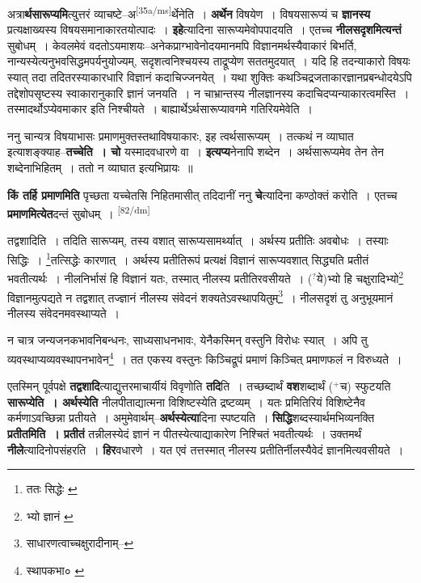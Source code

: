 \documentclass[article,12pt,a4paper]{memoir}
\newcommand{\unclear}[1]{($^{?}$#1)}
\newcommand{\add}[1]{($^{+}$#1)}
\begin{document}
	  \pstart अत्रा\textbf{र्थसारूप्यमि}त्युत्तरं व्याचष्टे--अ\leavevmode\textsuperscript{\rmlatinfont\tiny [35a/ms]}र्थेनेति । \textbf{अर्थेन} विषयेण । विषयसारूप्यं च \textbf{ज्ञानस्य} प्रत्यक्षाख्यस्य विषयसमानाकारतयोत्पादः । \textbf{इहे}त्यादिना सारूप्यमेवोपपादयति । एतच्च \textbf{नीलसदृशमित्यन्तं} सुबोधम् । केवलमेवं वदतोऽयमाशयः--अनेकप्राग्भावेनोदयमानमपि विज्ञानमर्थस्यैवाकारं बिभर्ति, नान्यस्येत्यनुभवसिद्धमपर्यनुयोज्यम्, सदृशत्वनिश्चयस्य ताद्रूप्येण सततमुदयात् । यदि हि तदन्याकारो विषयः स्यात् तदा तदितरस्याकारधारि विज्ञानं कदाचिज्जनयेत् । यथा शुक्तिः कथञ्चिद्रजताकारज्ञानप्रबन्धोदयेऽपि तद्देशोपसृष्टस्य स्वाकारानुकारि ज्ञानं जनयति । न चाभ्रान्तस्य नीलज्ञानस्य कदाचिदप्यन्याकारत्वमस्ति । तस्मादर्थोऽप्येवमाकार इति निश्चीयते । बाह्यार्थेऽर्थसारूप्यावगमे गतिरियमेवेति ।
	\pend
      

	  \pstart ननु चान्यत्र विषयाभासः प्रमाणमुक्तस्तथाविषयाकारः, इह त्वर्थसारूप्यम् । तत्कथं न व्याघात इत्याशङ्क्याह--\textbf{तच्चेति । चो} यस्मादवधारणे वा । \textbf{इत्यप्य}नेनापि शब्देन । अर्थसारूप्यमेव तेन तेन शब्देनाभिहितम् । ततो न व्याघात इत्यभिप्रायः ॥
	\pend
      

	  \pstart \textbf{किं तर्हि प्रमाणमिति} पृच्छता यच्चेतसि निहितमासीत् तदिदानीं ननु \textbf{चे}त्यादिना कण्ठोक्तं करोति । एतच्च \textbf{प्रमाणमित्येत}दन्तं सुबोधम् ।
	\pend
      \leavevmode\textsuperscript{\rmlatinfont\tiny [82/dm]}

	  \pstart तद्वशादिति । तदिति सारूप्यम्, तस्य वशात् सारूप्यसामर्थ्यात् । अर्थस्य प्रतीतिः अवबोधः । तस्याः सिद्धिः । \footnote{ततः सिद्धेः \cite{dp-msB}}तत्सिद्धेः कारणात् । अर्थस्य प्रतीतिरूपं प्रत्यक्षं विज्ञानं सारूप्यवशात् सिद्ध्यति प्रतीतं भवतीत्यर्थः । नीलनिर्भासं हि विज्ञानं यतः, तस्मात् नीलस्य प्रतीतिरवसीयते । \unclear{ये}भ्यो हि चक्षुरादिभ्यो\footnote{भ्यो ज्ञानं \cite{dp-msD} \cite{dp-msB}} विज्ञानमुत्पद्यते न तद्वशात् तज्ज्ञानं नीलस्य संवेदनं शक्यतेऽवस्थापयितुम्\footnote{साधारणत्वाच्चक्षुरादीनाम्--\cite{dp-msD-n}} । नीलसदृशं तु अनुभूयमानं नीलस्य संवेदनमवस्थाप्यते ।
	\pend
       

	  \pstart न चात्र जन्यजनकभावनिबन्धनः, साध्यसाधनभावः, येनैकस्मिन् वस्तुनि विरोधः स्यात् । अपि तु व्यवस्थाप्यव्यवस्थापनभावेन\footnote{स्थापकभा० \cite{dp-msA} \cite{dp-msB} \cite{dp-msC} \cite{dp-msD} \cite{dp-edP} \cite{dp-edE} \cite{dp-edH} \cite{dp-edN}} । तत एकस्य वस्तुनः किञ्चिद्रूपं प्रमाणं किञ्चित् प्रमाणफलं न विरुध्यते ।
	\pend
      

	  \pstart एतस्मिन् पूर्वपक्षे \textbf{तद्वशादि}त्याद्युत्तरमाचार्यीयं विवृणोति \textbf{तदि}ति । तच्छब्दार्थं \textbf{वश}शब्दार्थं \add{च} स्फुटयति \textbf{सारूप्येति । अर्थस्येति} नीलपीताद्यात्मना विशिष्टस्येति द्रष्टव्यम् । यतः प्रमितिरियं विशिष्टेनैव कर्मणाऽवच्छिन्ना प्रतीयते । अमुमेवार्थम्--\textbf{अर्थस्येत्या}दिना स्पष्टयति । \textbf{सिद्धि}शब्दस्यार्थमभिव्यनक्ति \textbf{प्रतीतमिति । प्रतीतं} तन्नीलस्येदं ज्ञानं न पीतस्येत्याद्याकारेण निश्चितं भवतीत्यर्थः । उक्तमर्थं \textbf{नीले}त्यादिनोपसंहरति । \textbf{हिर}वधारणे । यत एवं तत्तस्मात् नीलस्य प्रतीतिर्नीलस्यैवेदं ज्ञानमित्यवसीयते ।
	\pend
      
\end{document}

